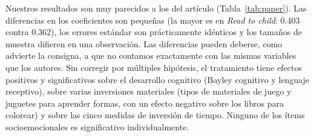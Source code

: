 \documentclass[11pt,a4paper]{article}
\begin{document}
Nuestros resultados son muy parecidos a los del artículo (Tabla~\ref{tab:paper}). Las diferencias en los coeficientes son pequeñas (la mayor es en \textit{Read to child}: 0.403 contra 0.362), los errores estándar son prácticamente idénticos y los tamaños de muestra difieren en una observación. Las diferencias pueden deberse, como advierte la consigna, a que no contamos exactamente con las mismas variables que los autores. Sin corregir por múltiples hipótesis, el tratamiento tiene efectos positivos y significativos sobre el desarrollo cognitivo (Bayley cognitivo y lenguaje receptivo), sobre varias inversiones materiales (tipos de materiales de juego y juguetes para aprender formas, con un efecto negativo sobre los libros para colorear) y sobre las cinco medidas de inversión de tiempo. Ninguno de los ítems socioemocionales es significativo individualmente.
\end{document}
